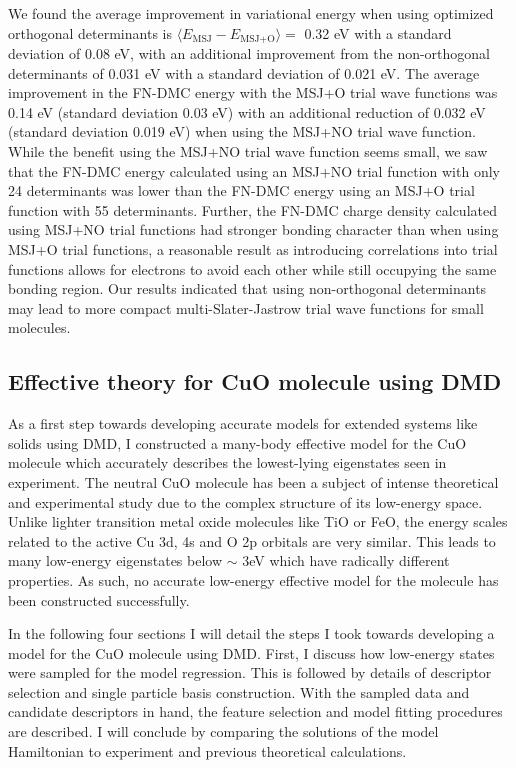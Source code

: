 \documentclass[12pt]{article}
\begin{document}
We found the average improvement in variational energy when using optimized orthogonal determinants is $\langle E_\text{MSJ} - E_\text{MSJ+O} \rangle = $ 0.32 eV with a standard deviation of 0.08 eV, with an additional improvement from the non-orthogonal determinants of 0.031 eV with a standard deviation of 0.021 eV.
The average improvement in the FN-DMC energy with the MSJ+O trial wave functions was 0.14 eV (standard deviation 0.03 eV) with an additional reduction of 0.032 eV (standard deviation 0.019 eV) when using the MSJ+NO trial wave function.
While the benefit using the MSJ+NO trial wave function seems small, we saw that the FN-DMC energy calculated using an MSJ+NO trial function with only 24 determinants was lower than the FN-DMC energy using an MSJ+O trial function with 55 determinants.
Further, the FN-DMC charge density calculated using MSJ+NO trial functions had stronger bonding character than when using MSJ+O trial functions, a reasonable result as introducing correlations into trial functions allows for electrons to avoid each other while still occupying the same bonding region. 
Our results indicated that using non-orthogonal determinants may lead to more compact multi-Slater-Jastrow trial wave functions for small molecules.

\subsection{Effective theory for CuO molecule using DMD}
As a first step towards developing accurate models for extended systems like solids using DMD, I constructed a many-body effective model for the CuO molecule which accurately describes the lowest-lying eigenstates seen in experiment.
The neutral CuO molecule has been a subject of intense theoretical and experimental study due to the complex structure of its low-energy space.
Unlike lighter transition metal oxide molecules like TiO or FeO, the energy scales related to the active Cu 3d, 4s and O 2p orbitals are very similar.
This leads to many low-energy eigenstates below $\sim $ 3eV which have radically different properties.
As such, no accurate low-energy effective model for the molecule has been constructed successfully.

In the following four sections I will detail the steps I took towards developing a model for the CuO molecule using DMD.
First, I discuss how low-energy states were sampled for the model regression.
This is followed by details of descriptor selection and single particle basis construction.
With the sampled data and candidate descriptors in hand, the feature selection and model fitting procedures are described.
I will conclude by comparing the solutions of the model Hamiltonian to experiment and previous theoretical calculations.
\end{document}

